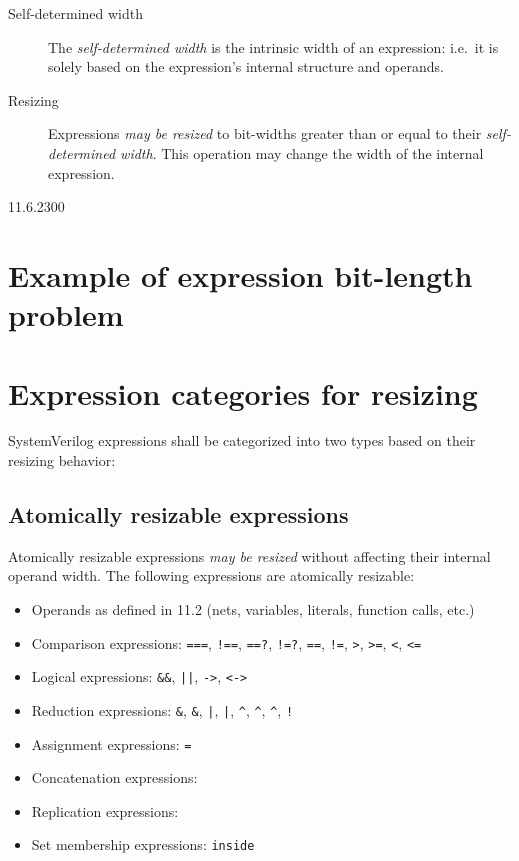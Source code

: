 \documentclass{article}
\newcommand{\tild}{\raisebox{-.7ex}{\textasciitilde{}}}
\newcommand{\sds}{\emph{self-determined width}}
\newcommand{\mbr}{\emph{may be resized}}
\newcommand{\compOp}{\texttt{===}, \texttt{!==}, \texttt{==?}, \texttt{!=?},
  \texttt{==}, \texttt{!=}, \texttt{>}, \texttt{>=}, \texttt{<}, \texttt{<=}}
\newcommand{\logicOp}{\texttt{\&\&}, \texttt{||}, \texttt{->}, \texttt{<->}}
\newcommand{\redOp}{\texttt{\&}, \texttt{\tild\&}, \texttt{|}, \texttt{\tild|},
\texttt{\^{}}, \texttt{\tild\^{}}, \texttt{\^{}\tild}, \texttt{!}}
\begin{document}
\begin{description}
  \item[Self-determined width]
    The \sds{} is the intrinsic width of an expression: i.e.~it is
    solely based on the expression's internal structure and operands.

  \item[Resizing]
    Expressions \mbr{} to bit-widths greater than or equal to their \sds{}. This
    operation may change the width of the internal expression.
\end{description}

\begin{lrmquote}{11.6.2}{300}
  \section{Example of expression bit-length problem}
  \textelp{}
\end{lrmquote}

\section{Expression categories for resizing}%

SystemVerilog expressions shall be categorized into two types based on their
resizing behavior:

\subsection{Atomically resizable expressions}%

Atomically resizable expressions \mbr{} without affecting their
internal operand width. The following expressions are atomically resizable:

\begin{itemize}
  \item Operands as defined in 11.2 (nets, variables, literals, function
    calls, etc.)
  \item Comparison expressions: \compOp{}
  \item Logical expressions: \logicOp{}
  \item Reduction expressions: \redOp{}
  \item Assignment expressions: \texttt{=}
  \item Concatenation expressions: \texttt{\string{\dots\string}}
  \item Replication expressions: \texttt{}
  \item Set membership expressions: \texttt{inside}
\end{itemize}
\end{document}
